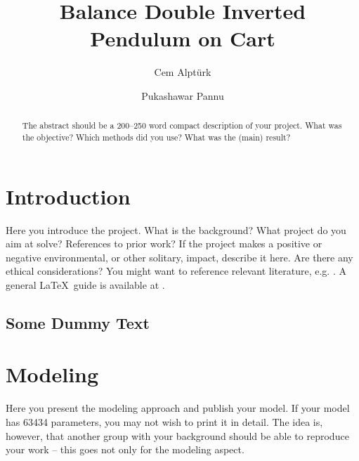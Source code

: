 \documentclass{LTHtwocol} %
\begin{document}
\begin{frontmatter}
\title{Balance Double Inverted Pendulum on Cart} %

\author[cem]{Cem Alpt\"urk}
\author[pukashawar]{Pukashawar Pannu}


\begin{abstract}
    The abstract should be a 200--250 word compact description of your project. What was the objective? Which methods did you use? What was the (main) result?
\end{abstract}

\end{frontmatter}


\section{Introduction}
Here you introduce the project. What is the background? What project do you aim at solve? References to prior work? If the project makes a positive or negative environmental, or other solitary, impact, describe it here. Are there any ethical considerations? You might want to reference relevant literature, e.g. \cite{openclosed2, Hellerstein2004, Yun2015}. A general \LaTeX\ guide is available at \cite{latexwiki}. 

\subsection{Some Dummy Text}
\kant[1] %

\section{Modeling}
Here you present the modeling approach and publish your model. If your model has 63434 parameters, you may not wish to print it in detail. The idea is, however, that another group with your background should be able to reproduce your work -- this goes not only for the modeling aspect.
\end{document}
